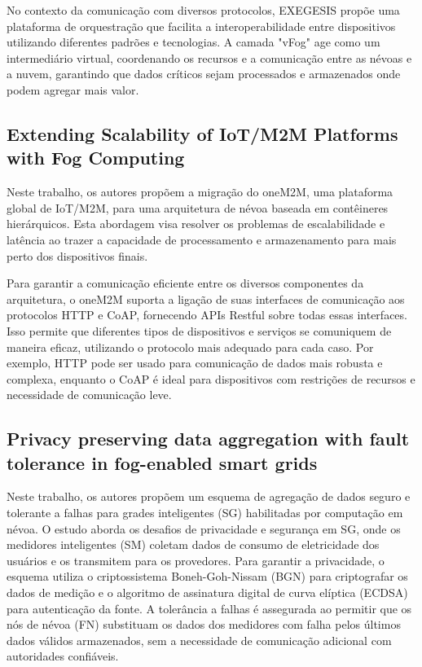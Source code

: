 No contexto da comunicação com diversos protocolos, EXEGESIS propõe uma plataforma de orquestração que facilita a interoperabilidade entre dispositivos utilizando diferentes padrões e tecnologias. A camada "vFog" age como um intermediário virtual, coordenando os recursos e a comunicação entre as névoas e a nuvem, garantindo que dados críticos sejam processados e armazenados onde podem agregar mais valor.

\subsection{Extending Scalability of IoT/M2M Platforms with Fog Computing}

Neste trabalho, os autores propõem a migração do oneM2M, uma plataforma global de IoT/M2M, para uma arquitetura de névoa baseada em contêineres hierárquicos. Esta abordagem visa resolver os problemas de escalabilidade e latência ao trazer a capacidade de processamento e armazenamento para mais perto dos dispositivos finais.

Para garantir a comunicação eficiente entre os diversos componentes da arquitetura, o oneM2M suporta a ligação de suas interfaces de comunicação aos protocolos HTTP e CoAP, fornecendo APIs Restful sobre todas essas interfaces. Isso permite que diferentes tipos de dispositivos e serviços se comuniquem de maneira eficaz, utilizando o protocolo mais adequado para cada caso. Por exemplo, HTTP pode ser usado para comunicação de dados mais robusta e complexa, enquanto o CoAP é ideal para dispositivos com restrições de recursos e necessidade de comunicação leve.

\subsection{Privacy preserving data aggregation with fault tolerance in fog-enabled smart grids}

Neste trabalho, os autores propõem um esquema de agregação de dados seguro e tolerante a falhas para grades inteligentes (SG) habilitadas por computação em névoa. O estudo aborda os desafios de privacidade e segurança em SG, onde os medidores inteligentes (SM) coletam dados de consumo de eletricidade dos usuários e os transmitem para os provedores. Para garantir a privacidade, o esquema utiliza o criptossistema Boneh-Goh-Nissam (BGN) para criptografar os dados de medição e o algoritmo de assinatura digital de curva elíptica (ECDSA) para autenticação da fonte. A tolerância a falhas é assegurada ao permitir que os nós de névoa (FN) substituam os dados dos medidores com falha pelos últimos dados válidos armazenados, sem a necessidade de comunicação adicional com autoridades confiáveis.

